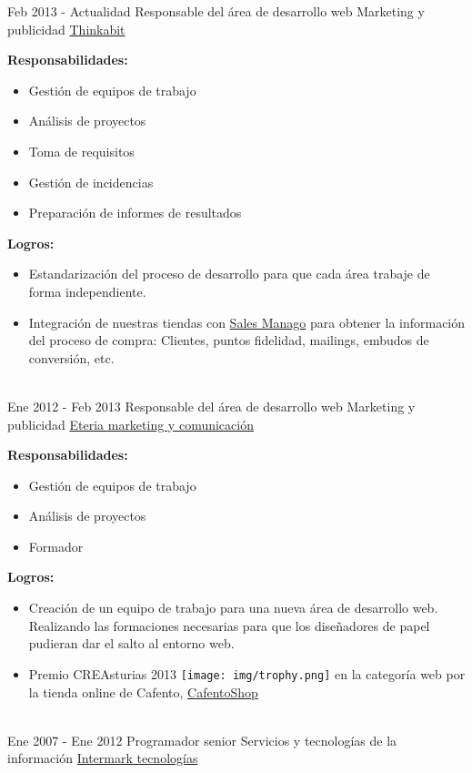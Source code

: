 \documentclass[letterpaper]{twentysecondcv} %
\begin{document}
\begin{twenty} %
	\twentyitem
	{Feb 2013 -}
	{Actualidad}
	{Responsable del área de desarrollo web}
	{Marketing y publicidad}
	{\href{http://www.thinkabit.es/}{Thinkabit}}
	{

		\textbf{Responsabilidades:}
		\begin{itemize}
			\item Gestión de equipos de trabajo
			\item Análisis de proyectos
			\item Toma de requisitos
			\item Gestión de incidencias
			\item Preparación de informes de resultados
		\end{itemize}

		\textbf{Logros:}
		\begin{itemize}
			\item Estandarización del proceso de desarrollo para que cada área trabaje de forma independiente.
			\item Integración de nuestras tiendas con \href{http://salesmanago.com/}{Sales Manago} para obtener la información del proceso de compra: Clientes, puntos fidelidad, mailings, embudos de conversión, etc.
		\end{itemize}
	}
	\\
	\twentyitem
	{Ene 2012 -}
	{Feb 2013}
	{Responsable del área de desarrollo web}
	{Marketing y publicidad}
	{\href{http://www.eteria.es}{Eteria marketing y comunicación}}
	{

		\textbf{Responsabilidades:}
		\begin{itemize}
			\item Gestión de equipos de trabajo
			\item Análisis de proyectos
			\item Formador
		\end{itemize}

		\textbf{Logros:}
		\begin{itemize}
			\item Creación de un equipo de trabajo para una nueva área de desarrollo web. Realizando las formaciones necesarias para que los diseñadores de papel pudieran dar el salto al entorno web.
			\item Premio CREAsturias 2013 {\texttt{[image: img/trophy.png]}}
				en la categoría web por la tienda online de Cafento, \href{https://www.cafentoshop.com/}{CafentoShop}
		\end{itemize}
	}
	\\
	\twentyitem
	{Ene 2007 -}
	{Ene 2012}
	{Programador senior}
	{Servicios y tecnologías de la información}
	{\href{http://www.intermarktecnologias.com/}{Intermark tecnologías}}
	{

}
\end{twenty}
\end{document}
